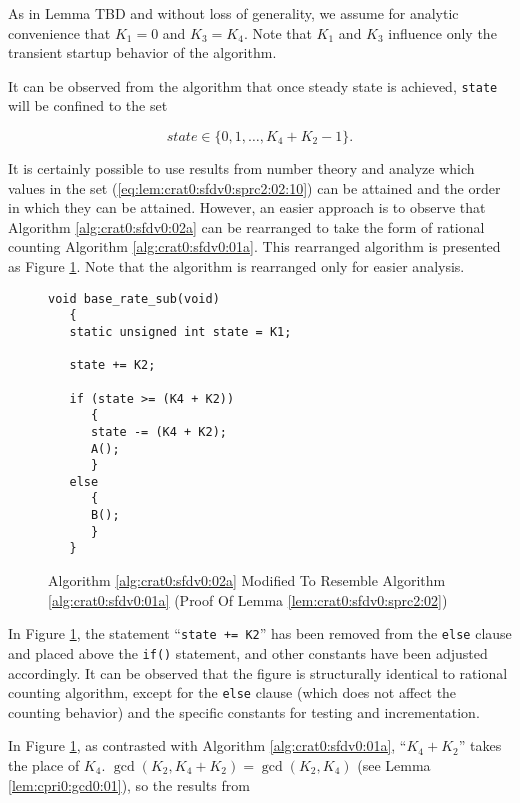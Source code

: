 \begin{vworklemmaproof}
As in Lemma TBD
and without
loss of generality, we assume for analytic
convenience that $K_1=0$ and $K_3=K_4$.  Note that
$K_1$ and $K_3$ influence only the transient startup
behavior of the algorithm.

It can be observed from the algorithm that once steady
state is achieved, \texttt{state} will be confined to the set

\begin{equation}
\label{eq:lem:crat0:sfdv0:sprc2:02:10}
state \in \{ 0, 1, \ldots , K_4 + K_2 - 1 \} .
\end{equation}

It is certainly possible to use results from
number theory and analyze which values in the 
set (\ref{eq:lem:crat0:sfdv0:sprc2:02:10}) can be 
attained and the order in which they can be attained.
However, an easier approach is to observe that 
Algorithm \ref{alg:crat0:sfdv0:02a} 
can be rearranged to take the form of
rational counting Algorithm \ref{alg:crat0:sfdv0:01a}.  
This rearranged
algorithm is presented as 
Figure \ref{fig:lem:crat0:sfdv0:sprc2:02:01}.  Note that the
algorithm is rearranged only for easier analysis.

\begin{figure}
\begin{verbatim}
void base_rate_sub(void)
   {
   static unsigned int state = K1;

   state += K2;
   
   if (state >= (K4 + K2))
      {
      state -= (K4 + K2);
      A();
      }
   else
      {
      B();
      }
   }
\end{verbatim}
\caption{Algorithm \ref{alg:crat0:sfdv0:02a} Modified To Resemble Algorithm \ref{alg:crat0:sfdv0:01a}
         (Proof Of Lemma \ref{lem:crat0:sfdv0:sprc2:02})}
\label{fig:lem:crat0:sfdv0:sprc2:02:01}
\end{figure}

In Figure \ref{fig:lem:crat0:sfdv0:sprc2:02:01}, the
statement ``\texttt{state += K2}'' has been removed from the
\texttt{else} clause and placed above the \texttt{if()} statement,
and other constants have been adjusted accordingly.
It can be observed that the figure
is structurally identical to rational counting algorithm, except for the 
\texttt{else} clause (which does not affect the counting behavior) and
the specific constants for testing and incrementation.

In Figure \ref{fig:lem:crat0:sfdv0:sprc2:02:01}, as contrasted with
Algorithm \ref{alg:crat0:sfdv0:01a}, ``$K_4 + K_2$'' takes the
place of $K_4$.  $\gcd(K_2, K_4 + K_2) = \gcd(K_2, K_4)$
(see Lemma \ref{lem:cpri0:gcd0:01}), so the 
results from 
\end{vworklemmaproof}

